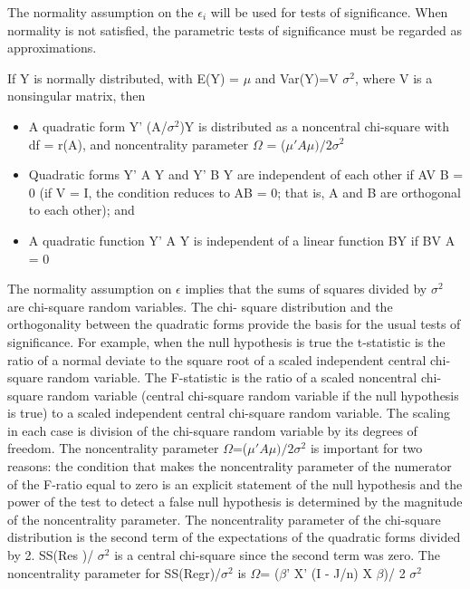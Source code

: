 \documentclass[letterpaper,11pt]{article}
\begin{document}
{The normality assumption on the $\epsilon_{i}$ will be used for tests of significance. When normality is
not satisfied, the parametric tests of significance must be regarded as approximations.

If Y is normally distributed, with E(Y) = $\mu$ and Var(Y)=V $\sigma^{2}$, where V is a nonsingular matrix, then
\begin{itemize}
\item A quadratic form Y' (A/$\sigma^{2}$)Y is distributed as a noncentral chi-square with df = r(A), and noncentrality 
parameter $\Omega$ = ($\mu' A \mu) /2 \sigma^{2}$

\item Quadratic forms Y' A Y  and Y' B Y are independent of each other if AV B = 0 (if V = I, the condition reduces
to AB = 0; that is, A and B are orthogonal to each other); and
\item A quadratic function Y' A Y is independent of a linear function BY if BV A = 0
\end{itemize}

The normality assumption on $\epsilon$ implies that the sums of squares divided by $\sigma^{2}$ are chi-square random variables. The chi-
square distribution and the orthogonality between the quadratic forms provide the basis for the usual tests of significance. For example, 
when the null hypothesis is true the t-statistic is the ratio of a normal deviate to the square root of a scaled independent central chi-
square random variable. The F-statistic is the ratio of a scaled noncentral chi-square random variable (central chi-square random variable 
if the null hypothesis is true) to a scaled independent central chi-square random variable. The scaling in each case is division of the
chi-square random variable by its degrees of freedom. The noncentrality parameter $\Omega$=($\mu' A \mu)/2 \sigma^{2}$ is important for two 
reasons: the condition that makes the noncentrality parameter of the numerator of the F-ratio equal to zero is an explicit statement of the 
null hypothesis and the power of the test to detect a false null hypothesis is determined by the magnitude of the noncentrality parameter. 
The noncentrality parameter of the chi-square distribution is the second term of the expectations of the quadratic forms divided by 2. SS(Res
)/ $\sigma^{2}$ is a central chi-square since the second term was zero. The noncentrality parameter for SS(Regr)/$\sigma^{2}$ is
$\Omega$= ($\beta$' X' (I - J/n) X $\beta$)/ 2 $\sigma^{2}$

}
\end{document}
